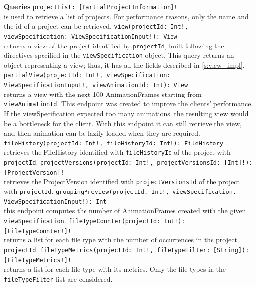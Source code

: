 \textbf{Queries}
\texttt{projectList:  [PartialProjectInformation]!} \\ 
is used to retrieve a list of projects. For performance reasons, only the name and the id of a project can be retrieved. 
\bigbreak
\texttt{view(projectId: Int!, viewSpecification: ViewSpecificationInput!): View} \\
returns a view of the project identified by \texttt{projectId}, built following the directives specified in the \texttt{viewSpecification} object. 
This query returns an object representing a view; thus, it has all the fields described in \autoref{s:view_impl}. 
\bigbreak
\texttt{partialView(projectId: Int!, viewSpecification: ViewSpecificationInput!, viewAnimationId: Int): View} \\
returns a view with the next 100 AnimationFrames starting from \texttt{viewAnimationId}. 
This endpoint was created to improve the clients' performance. If the viewSpecification expected too many animations, the resulting view would be a bottleneck for the client.
With this endpoint it can still retrieve the view, and then animation can be lazily loaded when they are required. 
\bigbreak
\texttt{fileHistory(projectId: Int!, fileHistoryId: Int!): FileHistory} \\
retrieves the FileHistory identified with \texttt{fileHistoryId} of the project with \texttt{projectId}.
\bigbreak
\texttt{projectVersions(projectId: Int!, projectVersionsId: [Int]!): [ProjectVersion]!} \\
retrieves the ProjectVersion identified with \texttt{projectVersionsId} of the project with \texttt{projectId}.
\bigbreak
\texttt{groupingPreview(projectId: Int!, viewSpecification: ViewSpecificationInput!): Int} \\
this endpoint computes the number of AnimationFrames created with the given \texttt{viewSpecification}.
\bigbreak
\texttt{fileTypeCounter(projectId: Int!): [FileTypeCounter!]!} \\
returns a list for each file type with the number of occurrences in the project \texttt{projectId}.
\bigbreak
\texttt{fileTypeMetrics(projectId: Int!, fileTypeFilter: [String]): [FileTypeMetrics!]!} \\
returns a list for each file type with its metrics. Only the file types in the \texttt{fileTypeFilter} list are considered. 


